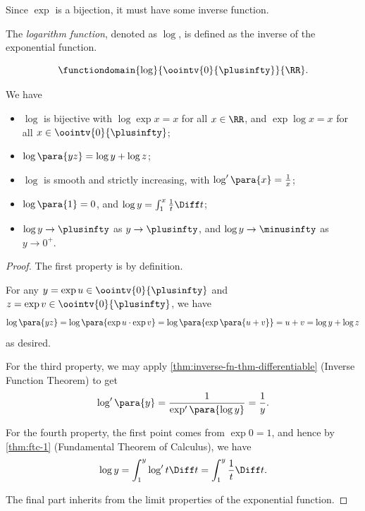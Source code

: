 Since \(\exp\) is a bijection, it must have some inverse function.

\begin{definition}
    \label{def:log}%
    The \emph{logarithm function}, denoted as \(\log\), is defined as the inverse of the exponential function.

    \[
        \functiondomain{\log}{\oointv{0}{\plusinfty}}{\RR}.
    \]
\end{definition}

\begin{lemma}
    \label{lem:properties-log}%
    We have
    \begin{itemize}
        \item \(\log\) is bijective with \(\log \exp x = x\) for all \(x \in \RR\), and \(\exp \log x = x\) for all \(x \in \oointv{0}{\plusinfty}\);
        \item \(\log\para{yz} = \log y + \log z\);
        \item \(\log\) is smooth and strictly increasing, with \(\log' \para{x} = \frac{1}{x}\);
        \item \(\log\para{1} = 0\), and \(\log y = \int_1^x \frac{1}{t} \Diff t\);
        \item \(\log y \to \plusinfty\) as \(y \to \plusinfty\), and \(\log y \to \minusinfty\) as \(y \to 0^+\).
    \end{itemize}
\end{lemma}

\begin{proof}
    The first property is by definition.

    For any \(y = \exp u \in \oointv{0}{\plusinfty}\) and \(z = \exp v \in \oointv{0}{\plusinfty}\), we have
    \[
        \log \para{yz} = \log \para{\exp u \cdot \exp v} = \log \para{\exp \para{u + v}} = u + v = \log y + \log z
    \]
    as desired.

    For the third property, we may apply \autoref{thm:inverse-fn-thm-differentiable} (Inverse Function Theorem) to get
    \[
        \log'\para{y} = \frac{1}{\exp'\para{\log y}} = \frac{1}{y}.
    \]

    For the fourth property, the first point comes from \(\exp 0 = 1\), and hence by \autoref{thm:ftc-1} (Fundamental Theorem of Calculus), we have
    \[
        \log y = \int_1^y \log' t \Diff t = \int_1^y \frac{1}{t} \Diff t.
    \]

    The final part inherits from the limit properties of the exponential function.
\end{proof}

